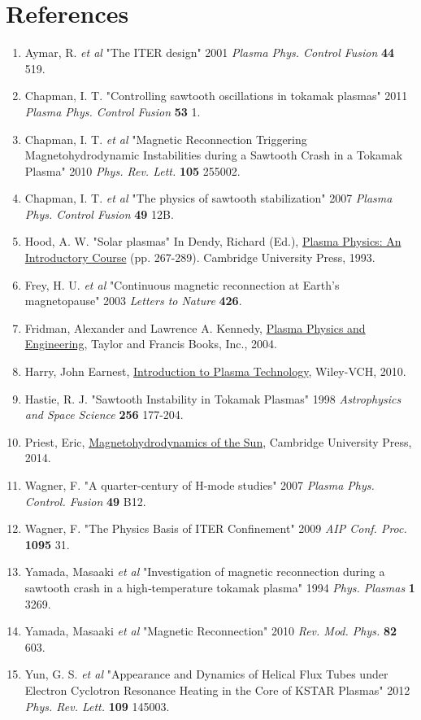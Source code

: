 \documentclass{article}
\begin{document}
\section{References}
\begin{enumerate}
\item Aymar, R. \textit{et al} "The ITER design" 2001 \textit{Plasma Phys. Control Fusion} \textbf{44} 519.
\item Chapman, I. T. "Controlling sawtooth oscillations in tokamak plasmas" 2011 \textit{Plasma Phys. Control Fusion} \textbf{53} 1.
\item Chapman, I. T. \textit{et al} "Magnetic Reconnection Triggering Magnetohydrodynamic Instabilities during a Sawtooth Crash in a Tokamak Plasma" 2010 \textit{Phys. Rev. Lett.} \textbf{105} 255002.
\item Chapman, I. T. \textit{et al} "The physics of sawtooth stabilization" 2007 \textit{Plasma Phys. Control Fusion} \textbf{49} 12B.
\item Hood, A. W. "Solar plasmas" In Dendy, Richard (Ed.), \underline{Plasma Physics: An Introductory Course} (pp. 267-289). Cambridge University Press, 1993.
\item Frey, H. U. \textit{et al} "Continuous magnetic reconnection at Earth's magnetopause" 2003 \textit{Letters to Nature} \textbf{426}.
\item Fridman, Alexander and Lawrence A. Kennedy,  \underline{Plasma Physics and Engineering},  Taylor and Francis Books, Inc., 2004.
\item Harry, John Earnest,  \underline{Introduction to Plasma Technology}, Wiley-VCH, 2010.
\item Hastie, R. J. "Sawtooth Instability in Tokamak Plasmas" 1998 \textit{Astrophysics and Space Science} \textbf{256} 177-204.
\item Priest, Eric,  \underline{Magnetohydrodynamics of the Sun},  Cambridge University Press, 2014.
\item Wagner, F. "A quarter-century of H-mode studies" 2007 \textit{Plasma Phys. Control. Fusion} \textbf{49} B12.
\item Wagner, F. "The Physics Basis of ITER Confinement" 2009 \textit{AIP Conf. Proc.} \textbf{1095} 31.
\item Yamada, Masaaki \textit{et al} "Investigation of magnetic reconnection during a sawtooth crash in a high‐temperature tokamak plasma" 1994 \textit{Phys. Plasmas} \textbf{1} 3269.
\item Yamada, Masaaki \textit{et al} "Magnetic Reconnection" 2010 \textit{Rev. Mod. Phys.} \textbf{82} 603.
\item Yun, G. S. \textit{et al} "Appearance and Dynamics of Helical Flux Tubes under Electron Cyclotron Resonance Heating in the Core of KSTAR Plasmas" 2012 \textit{Phys. Rev. Lett.} \textbf{109} 145003.
\end{enumerate}
\end{document}

